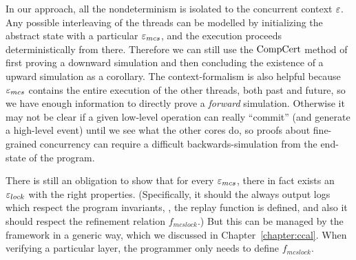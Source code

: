In our approach, all the nondeterminism is isolated to the concurrent
context ${\varepsilon}$. Any possible interleaving of the threads can be
modelled by initializing the abstract state with a particular
${\varepsilon}_{mcs}$, and the execution proceeds deterministically from
there. Therefore we can still use the $\mathrm{CompCert}$ method of first
proving a downward simulation and then concluding the existence of a
upward simulation as a corollary.
The context-formalism is also helpful because ${\varepsilon}_{mcs}$ contains
the entire execution of the other threads, both past and future, so we
have enough information to directly prove a \emph{forward}
simulation. Otherwise it may not be clear if a given low-level
operation can really ``commit'' (and generate a high-level event)
until we see what the other cores do, so proofs about fine-grained
concurrency can require a difficult backwards-simulation
from the end-state of the program.~\cite{DGLMQueue}

There is still an obligation to show that for every ${\varepsilon}_{mcs}$, there
in fact exists an ${\varepsilon}_{lock}$ with the right
properties. (Specifically, it should the always output logs which
respect the program invariants, \ie, the replay function is defined,
and also it should respect the refinement relation $f_{mcslock}$.) But this can
be managed by the framework in a generic way, which we discussed in Chapter~\ref{chapter:ccal}. When
verifying a particular layer, the programmer only needs to define $f_{mcslock}$.

